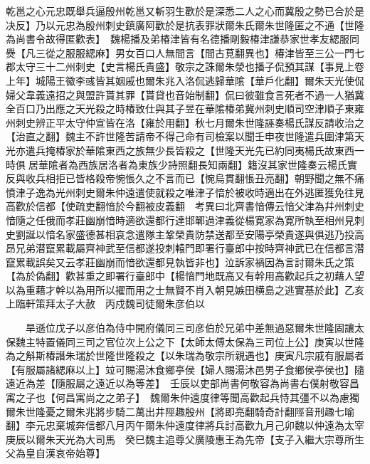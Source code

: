 乾邕之心元忠既舉兵逼殷州乾邕又斬羽生歡於是深悉二人之心而冀殷之勢已合於是决反】乃以元忠為殷州刺史鎮廣阿歡於是抗表罪狀爾朱氏爾朱世隆匿之不通【世隆為尚書令故得匿歡表】　魏楊播及弟椿津皆有名德播剛毅椿津謙恭家世孝友緦服同㸑【凡三從之服服緦麻】男女百口人無間言【間古莧翻異也】椿津皆至三公一門七郡太守三十二州刺史【史言楊氏貴盛】敬宗之誅爾朱滎也播子侃預其謀【事見上卷上年】城陽王徽李彧皆其姻戚也爾朱兆入洛侃逃歸華隂【華戶化翻】爾朱天光使侃婦父韋義遠招之與盟許貰其罪【貰貸也音始制翻】侃曰彼雖食言死者不過一人猶冀全百口乃出應之天光殺之時椿致仕與其子昱在華隂椿弟冀州刺史順司空津順子東雍州刺史辨正平太守仲宣皆在洛【雍於用翻】秋七月爾朱世隆誣奏楊氏謀反請收治之【治直之翻】魏主不許世隆苦請帝不得己命有司檢案以聞壬申夜世隆遣兵圍津第天光亦遣兵掩椿家於華隂東西之族無少長皆殺之【世隆天光先已約同夷楊氏故東西一時俱居華隂者為西族居洛者為東族少詩照翻長知兩翻】籍沒其家世隆奏云楊氏實反與收兵相拒已皆格殺帝惋悵久之不言而已【惋烏貫翻悵丑亮翻】朝野聞之無不痛憤津子逸為光州刺史爾朱仲遠遣使就殺之唯津子愔於被收時適出在外逃匿獲免往見高歡於信都【使疏吏翻愔於今翻被皮義翻　考異曰北齊書愔傳云愔父津為幷州刺史愔隨之任俄而孝莊幽崩愔時適欲還都行達邯鄲過津義從楊寛家為寛所執至相州見刺史劉誕以愔名家盛德甚相哀念遣隊主鞏榮貴防禁送都至安陽亭榮貴遂與俱逃乃投高昂兄弟潜竄累載屬齊神武至信都遂投刺轅門即署行臺郎中按時齊神武已在信都言潜竄累載誤矣又云孝莊幽崩而愔欲還都見執皆非也】泣訴家禍因為言討爾朱氏之策【為於偽翻】歡甚重之即署行臺郎中【楊愔門地既高又有幹用高歡起兵之初藉人望以為重藉才幹以為用所以擢而用之士無賢不肖入朝見嫉田横島之逃實基於此】乙亥上臨軒策拜太子大赦　丙戍魏司徒爾朱彦伯以

　　旱遜位戊子以彦伯為侍中開府儀同三司彦伯於兄弟中差無過惡爾朱世隆固讓太保魏主特置儀同三司之官位次上公之下【太師太傅太保為三司位上公】庚寅以世隆為之斛斯椿譖朱瑞於世隆世隆殺之【以朱瑞為敬宗所親遇也】庚寅凡宗戚有服屬者【有服屬諸緦麻以上】竝可賜湯沐食鄉亭侯【婦人賜湯沐邑男子食鄉侯亭侯也】隨遠近為差【隨服屬之遠近以為等差】　壬辰以吏部尚書何敬容為尚書右僕射敬容昌㝢之子也【何昌寓尚之之弟子】　魏爾朱仲遠度律等聞高歡起兵恃其彊不以為慮獨爾朱世隆憂之爾朱兆將步騎二萬出井陘趣殷州【將即亮翻騎奇計翻陘音刑趣七喻翻】李元忠棄城奔信都八月丙午爾朱仲遠度律將兵討高歡九月己卯魏以仲遠為太宰庚辰以爾朱天光為大司馬　癸巳魏主追尊父廣陵惠王為先帝【支子入繼大宗尊所生父為皇自漢哀帝始尊】

